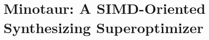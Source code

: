 \chapter{Minotaur: A SIMD-Oriented Synthesizing Superoptimizer}

\newcommand{\minotaur}{Minotaur}








